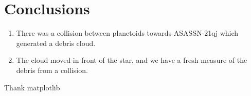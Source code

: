 \documentclass{aa}
\begin{document}
\section{Conclusions}\label{sec:conclusion}

   \begin{enumerate}
      \item There was a collision between planetoids towards ASASSN-21qj which generated a debris cloud.
      \item The cloud moved in front of the star, and we have a fresh measure of the debris from a collision.
   \end{enumerate}

\begin{acknowledgements}
Thank matplotlib

\end{acknowledgements}



\end{document}
